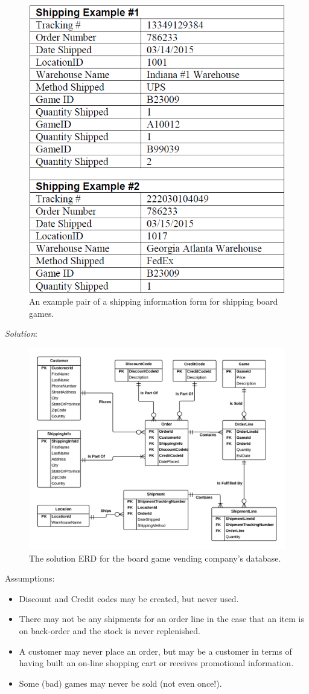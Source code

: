 \documentclass{article}
\begin{document}
\begin{figure}[h!]
  \centering
  \includegraphics[width=.35\linewidth]{HW08_Ex01_shipping_form}
  \caption{An example pair of a shipping information form for shipping board games.}
  \label{fig:HW08_Ex01_order_form}
\end{figure}

\newpage
\textit{Solution}:\\

  \begin{figure}[h!]
    \centering
    \includegraphics[width=.95\linewidth]{HW08_Ex01_solution_ERD}
    \caption{The solution ERD for the board game vending company's database.}
    \label{fig:HW07_Ex01}
  \end{figure}
Assumptions:
\begin{itemize}
  \item Discount and Credit codes may be created, but never used.
  \item There may not be any shipments for an order line in the case that an item is on back-order and the stock is never replenished.
  \item A customer may never place an order, but may be a customer in terms of having built an on-line shopping cart or receives promotional information.
  \item Some (bad) games may never be sold (not even once!).
\end{itemize}
%
%
%
\newpage
\end{document}
